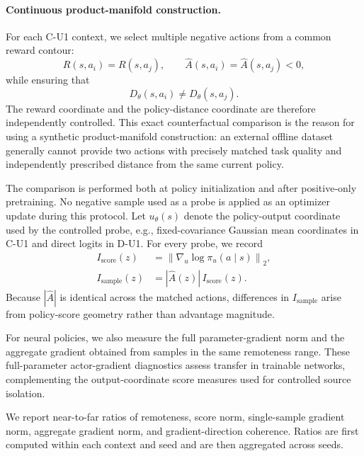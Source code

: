 \documentclass{article}
\theoremstyle{plain}
\theoremstyle{definition}
\theoremstyle{remark}
\begin{document}
\paragraph{Continuous product-manifold construction.}
For each C-U1 context, we select multiple negative actions from a common
reward contour:
\begin{equation}
    R(s,a_i)
    =
    R(s,a_j),
    \qquad
    \widehat A(s,a_i)
    =
    \widehat A(s,a_j)
    <0,
    \label{eq:source_equal_quality}
\end{equation}
while ensuring that
\begin{equation}
    D_\theta(s,a_i)
    \neq
    D_\theta(s,a_j).
    \label{eq:source_different_remoteness}
\end{equation}
The reward coordinate and the policy-distance coordinate are therefore
independently controlled. This exact counterfactual comparison is the
reason for using a synthetic product-manifold construction: an external
offline dataset generally cannot provide two actions with precisely
matched task quality and independently prescribed distance from the
same current policy.

The comparison is performed both at policy initialization and after
positive-only pretraining. No negative sample used as a probe is applied
as an optimizer update during this protocol. Let \(u_\theta(s)\) denote
the policy-output coordinate used by the controlled probe, e.g.,
fixed-covariance Gaussian mean coordinates in C-U1 and direct logits in
D-U1. For every probe, we record
\begin{equation}
\begin{aligned}
I_{\mathrm{score}}(z)
&=
\left\|
\nabla_{u}\log \pi_{u}(a\mid s)
\right\|_2,\\
I_{\mathrm{sample}}(z)
&=
|\widehat A(z)|\, I_{\mathrm{score}}(z).
\end{aligned}
\label{eq:source_influence_metrics}
\end{equation}
Because \(|\widehat A|\) is identical across the matched actions,
differences in \(I_{\mathrm{sample}}\) arise from policy-score geometry
rather than advantage magnitude.

For neural policies, we also measure the full parameter-gradient norm and the
aggregate gradient obtained from samples in the same remoteness range. These
full-parameter actor-gradient diagnostics assess transfer in trainable networks,
complementing the output-coordinate score measures used for controlled source
isolation.

We report near-to-far ratios of remoteness, score norm, single-sample
gradient norm, aggregate gradient norm, and gradient-direction
coherence. Ratios are first computed within each context and seed and
are then aggregated across seeds.
\end{document}
